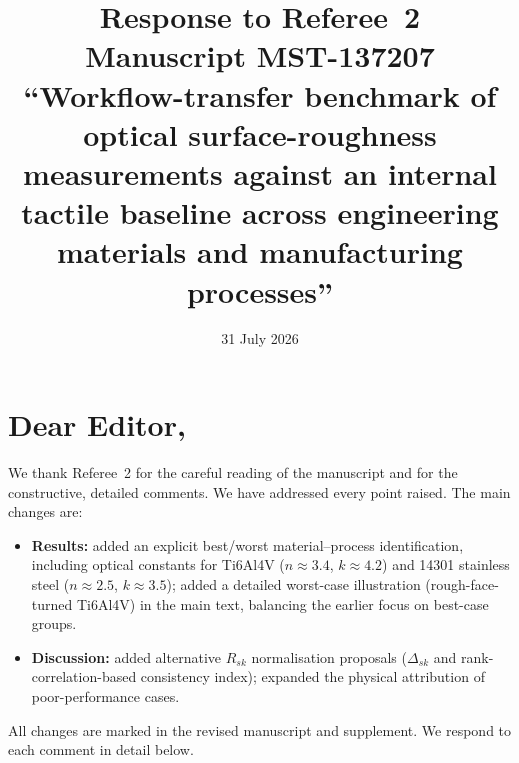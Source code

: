 \documentclass[10pt]{article}
\begin{document}
\title{Response to Referee~2 \\
Manuscript MST-137207 \\
{\normalsize ``Workflow-transfer benchmark of optical surface-roughness measurements against an internal tactile baseline across engineering materials and manufacturing processes''}}

\date{31 July 2026}
\maketitle

\section*{Dear Editor,}

We thank Referee~2 for the careful reading of the manuscript and for the constructive, detailed comments. We have addressed every point raised. The main changes are:

\begin{itemize}
    \item \textbf{Results:} added an explicit best/worst material--process identification, including optical constants for Ti6Al4V ($n \approx 3.4$, $k \approx 4.2$) and 14301 stainless steel ($n \approx 2.5$, $k \approx 3.5$); added a detailed worst-case illustration (rough-face-turned Ti6Al4V) in the main text, balancing the earlier focus on best-case groups.
    \item \textbf{Discussion:} added alternative $R_{sk}$ normalisation proposals ($\Delta_{sk}$ and rank-correlation-based consistency index); expanded the physical attribution of poor-performance cases.
\end{itemize}

All changes are marked in the revised manuscript and supplement. We respond to each comment in detail below.
\end{document}
